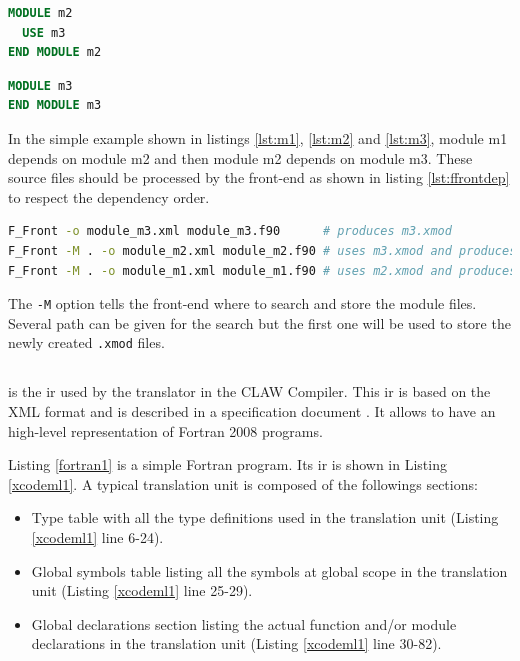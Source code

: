 \begin{lstlisting}[label=lst:m2, language=Fortran, caption=module\_m2.f90]
MODULE m2
  USE m3
END MODULE m2
\end{lstlisting}

\begin{lstlisting}[label=lst:m3, language=Fortran, caption=module\_m3.f90]
MODULE m3
END MODULE m3
\end{lstlisting}

In the simple example shown in listings \ref{lst:m1}, \ref{lst:m2} and
\ref{lst:m3}, module m1 depends on module m2 and then module m2
depends on module m3. These source files should be processed by the front-end
as shown in listing \ref{lst:ffrontdep} to respect the dependency order.

\begin{lstlisting}[label=lst:ffrontdep, language=Bash, caption=Parse module with dependencies]
F_Front -o module_m3.xml module_m3.f90      # produces m3.xmod
F_Front -M . -o module_m2.xml module_m2.f90 # uses m3.xmod and produces m2.xmod
F_Front -M . -o module_m1.xml module_m1.f90 # uses m2.xmod and produces m1.xmod
\end{lstlisting}

The \lstinline|-M| option tells the front-end where to search and store the 
module files. Several path can be given for the search but the first one will
be used to store the newly created \lstinline|.xmod| files.


\subsection{\xcodemlf}
\xcodemlf is the \gls{ir} used by the
translator in the CLAW Compiler. This \gls{ir} is based on the XML
format and is described in a specification 
document \cite{omni:xcodemlf95,omni:xcodemlf2008}. It allows to have an
high-level representation of Fortran 2008 programs.

Listing \ref{fortran1} is a simple Fortran program. Its \xcodemlf \gls{ir} is
shown in Listing \ref{xcodeml1}. A typical \xcodemlf translation unit is
composed of the followings sections:
\begin{itemize}
\item Type table with all the type definitions used in the translation unit
(Listing \ref{xcodeml1} line 6-24).
\item Global symbols table listing all the symbols at global scope in the
translation unit (Listing
\ref{xcodeml1} line 25-29).
\item Global declarations section listing the actual function and/or module
declarations in the translation unit (Listing \ref{xcodeml1} line 30-82).
\end{itemize}

